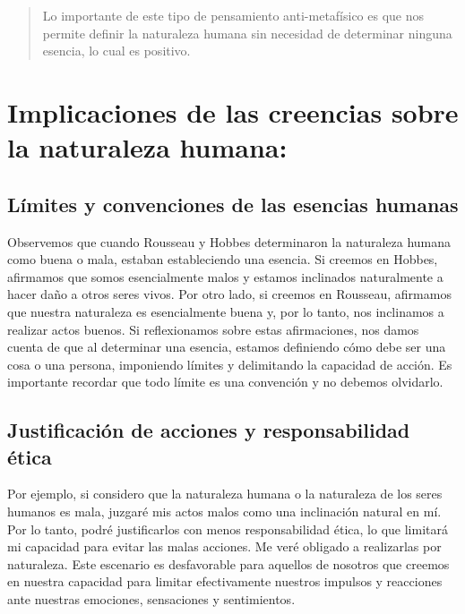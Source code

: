 \documentclass[
  jou,
  floatsintext,
  longtable,
  a4paper,
  nolmodern,
  notxfonts,
  notimes,
  12pt,
  colorlinks=true,linkcolor=blue,citecolor=blue,urlcolor=blue]{apa7}
\begin{document}
\begin{quote}
Lo importante de este tipo de pensamiento anti-metafísico es que nos
permite definir la naturaleza humana sin necesidad de determinar ninguna
esencia, lo cual es positivo.
\end{quote}

\section{Implicaciones de las creencias sobre la naturaleza
humana:}\label{implicaciones-de-las-creencias-sobre-la-naturaleza-humana}

\subsection{Límites y convenciones de las esencias
humanas}\label{luxedmites-y-convenciones-de-las-esencias-humanas}

Observemos que cuando Rousseau y Hobbes determinaron la naturaleza
humana como buena o mala, estaban estableciendo una esencia. Si creemos
en Hobbes, afirmamos que somos esencialmente malos y estamos inclinados
naturalmente a hacer daño a otros seres vivos. Por otro lado, si creemos
en Rousseau, afirmamos que nuestra naturaleza es esencialmente buena y,
por lo tanto, nos inclinamos a realizar actos buenos. Si reflexionamos
sobre estas afirmaciones, nos damos cuenta de que al determinar una
esencia, estamos definiendo cómo debe ser una cosa o una persona,
imponiendo límites y delimitando la capacidad de acción. Es importante
recordar que todo límite es una convención y no debemos olvidarlo.

\subsection{Justificación de acciones y responsabilidad
ética}\label{justificaciuxf3n-de-acciones-y-responsabilidad-uxe9tica}

Por ejemplo, si considero que la naturaleza humana o la naturaleza de
los seres humanos es mala, juzgaré mis actos malos como una inclinación
natural en mí. Por lo tanto, podré justificarlos con menos
responsabilidad ética, lo que limitará mi capacidad para evitar las
malas acciones. Me veré obligado a realizarlas por naturaleza. Este
escenario es desfavorable para aquellos de nosotros que creemos en
nuestra capacidad para limitar efectivamente nuestros impulsos y
reacciones ante nuestras emociones, sensaciones y sentimientos.
\end{document}
